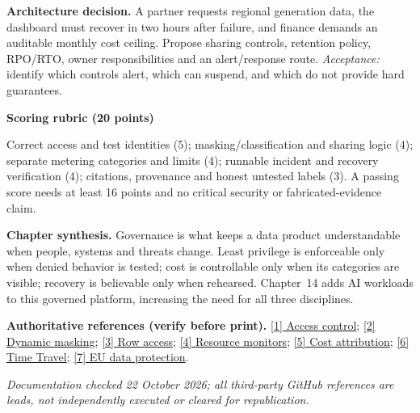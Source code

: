 \documentclass[11pt,twoside]{article}
\begin{document}
\textbf{Architecture decision.} A partner requests regional generation data, the dashboard must recover in two hours after failure, and finance demands an auditable monthly cost ceiling. Propose sharing controls, retention policy, RPO/RTO, owner responsibilities and an alert/response route. \emph{Acceptance:} identify which controls alert, which can suspend, and which do not provide hard guarantees.
\begin{whitebox}\textbf{Scoring rubric (20 points)}\par
Correct access and test identities (5); masking/classification and sharing logic (4); separate metering categories and limits (4); runnable incident and recovery verification (4); citations, provenance and honest untested labels (3). A passing score needs at least 16 points and no critical security or fabricated-evidence claim.
\end{whitebox}
\textbf{Chapter synthesis.} Governance is what keeps a data product understandable when people, systems and threats change. Least privilege is enforceable only when denied behavior is tested; cost is controllable only when its categories are visible; recovery is believable only when rehearsed. Chapter~14 adds AI workloads to this governed platform, increasing the need for all three disciplines.
{\fontsize{7.8}{9.3}\selectfont\textbf{Authoritative references (verify before print).}\quad
\href{https://docs.snowflake.com/en/user-guide/security-access-control-overview}{[1] Access control};
\href{https://docs.snowflake.com/en/user-guide/security-column-ddm-intro}{[2] Dynamic masking};
\href{https://docs.snowflake.com/en/user-guide/security-row-intro}{[3] Row access};
\href{https://docs.snowflake.com/en/user-guide/resource-monitors}{[4] Resource monitors};
\href{https://docs.snowflake.com/en/user-guide/cost-attributing}{[5] Cost attribution};
\href{https://docs.snowflake.com/en/user-guide/data-time-travel}{[6] Time Travel};
\href{https://commission.europa.eu/law/law-topic/data-protection_en}{[7] EU data protection}.\par
\textit{Documentation checked 22 October 2026; all third-party GitHub references are leads, not independently executed or cleared for republication.}}
\end{document}
